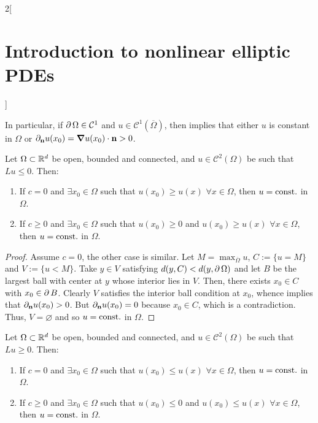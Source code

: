 \documentclass[../../../main_math.tex]{subfiles}
\begin{document}
\begin{multicols}{2}[\section{Introduction to nonlinear elliptic PDEs}]
\begin{lemma}
  \end{lemma}
  \begin{remark}
    In particular, if $\operatorname{\partial}\Omega\in\mathcal{C}^1$ and $u\in \mathcal{C}^1(\overline{\Omega})$, then  implies that either $u$ is constant in $\Omega$ or $\partial_{\boldsymbol{\mathrm{n}}}u(x_0)=\grad u(x_0)\cdot \boldsymbol{\mathrm{n}}>0$.
  \end{remark}
  \begin{theorem}\label{INEPDE:strong_max_principle}
    Let $\Omega\subset\mathbb{R}^d$ be open, bounded and connected, and $u\in \mathcal{C}^2(\Omega)$ be such that $Lu\leq 0$. Then:
    \begin{enumerate}
      \item If $c=0$ and $\exists x_0\in\Omega$ such that $u(x_0)\geq u(x)$ $\forall x\in\Omega$, then $u=\text{const.}$ in $\Omega$.
      \item If $c\geq 0$ and $\exists x_0\in\Omega$ such that $u(x_0)\geq 0$ and $u(x_0)\geq u(x)$ $\forall x\in\Omega$, then $u=\text{const.}$ in $\Omega$.
    \end{enumerate}
  \end{theorem}
  \begin{proof}
    Assume $c=0$, the other case is similar. Let $\displaystyle M=\max_{\overline{\Omega}}u$, $C:= \{u=M\}$ and $V:=\{u<M\}$. Take $y\in V$ satisfying $d(y,C)<d(y,\operatorname{\partial}{\Omega})$ and let $B$ be the largest ball with center at $y$ whose interior lies in $V$. Then, there exists $x_0\in C$ with $x_0\in \operatorname{\partial}{B}$. Clearly $V$ satisfies the interior ball condition at $x_0$, whence  implies that $\partial_{\boldsymbol{\mathrm{n}}}u(x_0)>0$. But $\partial_{\boldsymbol{\mathrm{n}}}u(x_0)=0$ because $x_0\in C$, which is a contradiction. Thus, $V=\varnothing$ and so $u=\text{const.}$ in $\Omega$.
  \end{proof}
  \begin{theorem}\label{INEPDE:strong_min_principle}
    Let $\Omega\subset\mathbb{R}^d$ be open, bounded and connected, and $u\in \mathcal{C}^2(\Omega)$ be such that $Lu\geq 0$. Then:
    \begin{enumerate}
      \item If $c=0$ and $\exists x_0\in\Omega$ such that $u(x_0)\leq u(x)$ $\forall x\in\Omega$, then $u=\text{const.}$ in $\Omega$.
      \item If $c\geq 0$ and $\exists x_0\in\Omega$ such that $u(x_0)\leq 0$ and $u(x_0)\leq u(x)$ $\forall x\in\Omega$, then $u=\text{const.}$ in $\Omega$.
    \end{enumerate}
  \end{theorem}

\end{multicols}
\end{document}
